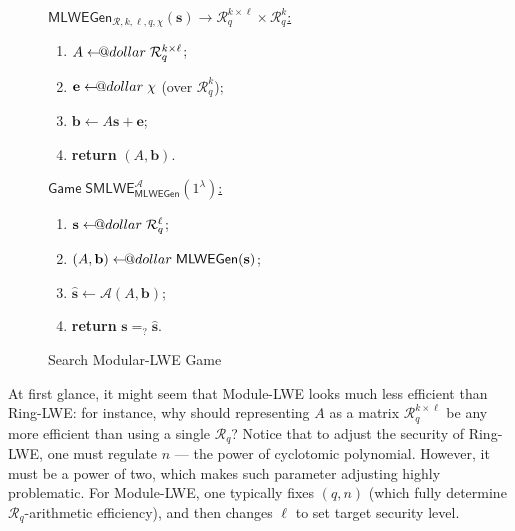 \documentclass{template}
\makeatletter
\newcommand\leftarrowS{\leftarrow\joinrel\smalldollar}
\newcommand{\smalldollar}{\mathrel{\mathpalette\small@dollar\relax}}
\newcommand{\small@dollar}[2]{%
  \vcenter{\hbox{%
    $#1\textnormal{\fontsize{0.7\dimexpr\f@size pt}{0}\selectfont\$}$%
  }}%
}
\makeatother
\begin{document}
\begin{figure}[ht]
    \centering
    \begin{minipage}{0.45\linewidth}
        \begin{mdframed}[linecolor=black, linewidth=1pt,
                         skipabove=10pt, skipbelow=10pt]
        \colorbox{green!10}{\underline{$\mathsf{MLWEGen}_{\mathcal{R},k,\ell,q,\chi}(\mathbf{s}) \to \mathcal{R}_q^{k \times \ell}
            \times \mathcal{R}_q^{k}$:}}
        \begin{enumerate}
            \item $A \leftarrowS \mathcal{R}_q^{k \times \ell}$;
            \item $\mathbf{e} \leftarrowS \chi$ (over $\mathcal{R}_q^k$);
            \item $\mathbf{b} \gets A\mathbf{s} + \mathbf{e}$;
            \item \textbf{return} $(A,\mathbf{b})$.
        \end{enumerate}
        \end{mdframed}
        \caption{Modular-LWE $(\mathcal{R},k,\ell,q,\chi)$ instance generation} 
        \label{fig:mlwe-gen}
    \end{minipage}
    \hfill
    \begin{minipage}{0.45\linewidth}
        \begin{mdframed}[linecolor=black, linewidth=1pt,
                         skipabove=10pt, skipbelow=10pt]
        \colorbox{green!10}{\underline{$\mathsf{Game}\;\mathsf{SMLWE}_{\mathsf{MLWEGen}}^{\mathcal{A}}(1^{\lambda})$:}}
        \begin{enumerate}
            \item $\mathbf{s} \leftarrowS \mathcal{R}_q^{\ell}$;
            \item $(A,\mathbf{b}) \leftarrowS \mathsf{MLWEGen}(\mathbf{s})$;
            \item $\widehat{\mathbf{s}} \gets \mathcal{A}(A,\mathbf{b})$;
            \item \textbf{return} $\mathbf{s} =_? \widehat{\mathbf{s}}$.
        \end{enumerate}
        \end{mdframed}
        \caption{Search Modular-LWE Game}
        \label{fig:mlwe-game}
    \end{minipage}
\end{figure}

At first glance, it might seem that Module-LWE looks much less efficient than
Ring-LWE: for instance, why should representing $A$ as a matrix
$\mathcal{R}_q^{k \times \ell}$ be any more efficient than using a single
$\mathcal{R}_q$? Notice that to adjust the security of Ring-LWE, one must
regulate $n$ --- the power of cyclotomic polynomial. However, it must be a power
of two, which makes such parameter adjusting highly problematic. For Module-LWE,
one typically fixes $(q,n)$ (which fully determine $\mathcal{R}_q$-arithmetic
efficiency), and then changes $\ell$ to set target security level.
\end{document}
